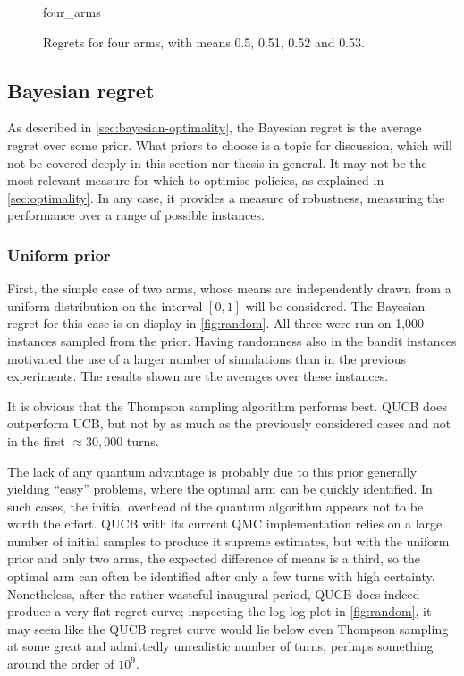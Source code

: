 \begin{figure}
    \centering
    \newcommand{\myoptions}{
        width=10cm,
        height=8cm,
        xlabel={Kiloturn},
        ylabel={Regret},
        legend entries={UCB, QUCB, Thompson},
        legend pos=north west,
        legend cell align=left,
        mystyle,
    }
    {four_arms}
    \caption[
        Regrets for four arms, with means 0.5, 0.51, 0.52 and 0.53.
    ]
    {
        Regrets for four arms, with means 0.5, 0.51, 0.52 and 0.53.
    }
    \label{fig:four_arms}
\end{figure}

\clearpage
\subsection{Bayesian regret}
\label{sec:results_bayesian}
As described in \cref{sec:bayesian-optimality}, the Bayesian regret is the average regret over some prior.
What priors to choose is a topic for discussion, which will not be covered deeply in this section nor thesis in general.
It may not be the most relevant measure for which to optimise policies, as explained in \cref{sec:optimality}.
In any case, it provides a measure of robustness, measuring the performance over a range of possible instances.

\subsubsection{Uniform prior}
First, the simple case of two arms, whose means are independently drawn from a uniform distribution on the interval $[0, 1]$ will be considered.
The Bayesian regret for this case is on display in \cref{fig:random}.
All three were run on 1,000 instances sampled from the prior.
Having randomness also in the bandit instances motivated the use of a larger number of simulations than in the previous experiments.
The results shown are the averages over these instances.

It is obvious that the Thompson sampling algorithm performs best.
QUCB does outperform UCB, but not by as much as the previously considered cases and not in the first $\approx 30,000$ turns.

The lack of any quantum advantage is probably due to this prior generally yielding \enquote{easy} problems, where the optimal arm can be quickly identified.
In such cases, the initial overhead of the quantum algorithm appears not to be worth the effort.
QUCB with its current QMC implementation relies on a large number of initial samples to produce it supreme estimates, but with the uniform prior and only two arms, the expected difference of means is a third, so the optimal arm can often be identified after only a few turns with high certainty.
Nonetheless, after the rather wasteful inaugural period, QUCB does indeed produce a very flat regret curve; inspecting the log-log-plot in \cref{fig:random}, it may seem like the QUCB regret curve would lie below even Thompson sampling at some great and admittedly unrealistic number of turns, perhaps something around the order of $10^{9}$.



